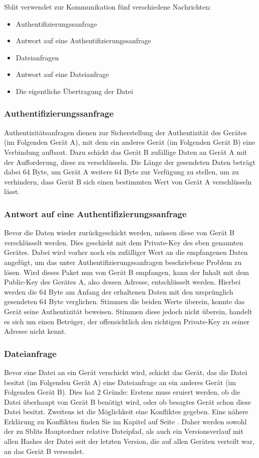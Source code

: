 Sblit verwendet zur Kommunikation fünf verschiedene Nachrichten:
\begin{itemize}
	\item Authentifizierungssanfrage
	\item Antwort auf eine Authentifizierungssanfrage
	\item Dateianfragen
	\item Antwort auf eine Dateianfrage
	\item Die eigentliche Übertragung der Datei
\end{itemize}
\subsubsection*{Authentifizierungssanfrage}
Authentizitätsanfragen dienen zur Sicherstellung der Authentizität des Gerätes (im Folgenden Gerät A), mit dem ein anderes Gerät (im Folgenden Gerät B) eine Verbindung aufbaut. Dazu schickt das Gerät B zufällige Daten an Gerät A mit der Aufforderung, diese zu verschlüsseln. Die Länge der gesendeten Daten beträgt dabei 64 Byte, um Gerät A weitere 64 Byte zur Verfügung zu stellen, um zu verhindern, dass Gerät B sich einen bestimmten Wert von Gerät A verschlüsseln lässt.

\subsubsection*{Antwort auf eine Authentifizierungssanfrage}
Bevor die Daten wieder zurückgeschickt werden, müssen diese von Gerät B verschlüsselt werden. Dies geschieht mit dem Private-Key des eben genannten Gerätes. Dabei wird vorher noch ein zufälliger Wert an die empfangenen Daten angefügt, um das unter Authentifizierungssanfragen beschriebene Problem zu lösen.
Wird dieses Paket nun von Gerät B empfangen, kann der Inhalt mit dem Public-Key des Gerätes A, also dessen Adresse, entschlüsselt werden. Hierbei werden die 64 Byte am Anfang der erhaltenen Daten mit den ursprünglich gesendeten 64 Byte verglichen. Stimmen die beiden Werte überein, konnte das Gerät seine Authentizität beweisen. Stimmen diese jedoch nicht überein, handelt es sich um einen Betrüger, der offensichtlich den richtigen Private-Key zu seiner Adresse nicht kennt.

\subsubsection*{Dateianfrage}
Bevor eine Datei an ein Gerät verschickt wird, schickt das Gerät, das die Datei besitzt (im Folgenden Gerät A) eine Dateianfrage an ein anderes Gerät (im Folgenden Gerät B). Dies hat 2 Gründe: Erstens muss eruiert werden, ob die Datei überhaupt von Gerät B benötigt wird, oder ob besagtes Gerät schon diese Datei besitzt. Zweitens ist die Möglichkeit eine Konfliktes gegeben. Eine nähere Erklärung zu Konflikten finden Sie im Kapitel  auf Seite \pageref{Konflikt}. Daher werden sowohl der zu Sblits Hauptordner relative Dateipfad, als auch ein Versionsverlauf mit allen Hashes der Datei seit der letzten Version, die auf allen Geräten verteilt war, an das Gerät B versendet. 


